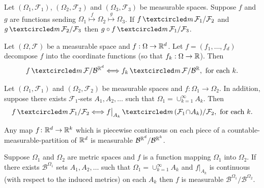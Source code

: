 \begin{theorem}
\label{thm: composition of measurable}
Let $(\Omega_1,\mathcal F_1)$, $(\Omega_2,\mathcal F_2)$ and $(\Omega_3,\mathcal F_3)$ be measurable spaces. Suppose $f$ and $g$ are functions sending $\Omega_1\overset{f} \longmapsto \Omega_2 \overset{g}\longmapsto \Omega_3$. If $f\mcirc \mathcal F_1/\mathcal F_2$ and $g\mcirc  \mathcal F_2/\mathcal F_3$ then $g\circ f \mcirc\mathcal F_1/\mathcal F_3$.
\end{theorem}


\begin{corollary}
\label{coordM}
Let $(\Omega,\mathcal F)$ be a measurable space and $f:\Omega\rightarrow \Bbb R^d$. Let $f=(f_1,\ldots, f_d)$ decompose $f$ into the coordinate functions (so that $f_k:\Omega\rightarrow \Bbb R$). Then
\[ f\mcirc \mathcal F/\mathcal B^{\Bbb R^d}\Longleftrightarrow  f_k\mcirc \mathcal F/\mathcal B^{\Bbb R}, \text{ for each $k$.} \]
\end{corollary}



\begin{theorem}
Let $(\Omega_1, \mathcal F_1)$ and $(\Omega_2,\mathcal F_2)$ be measurable spaces and $f\colon \Omega_1 \rightarrow \Omega_2$.  In addition, suppose there exists $\mathcal F_1$-sets $A_1,A_2,\ldots$ such that $\Omega_1 = \cup_{k=1}^\infty A_k$. Then
\[ f\mcirc \mathcal F_1/\mathcal F_2 \Longleftrightarrow  f\bigr|_{A_k} \mcirc (\mathcal F_1\!\cap\! A_k)/\mathcal F_2, \text{ for each $k$.} \]
\end{theorem}

\begin{corollary}
Any map $f\colon \Bbb R^d\rightarrow \Bbb R^k$ which is piecewise continuous on each piece of a  countable-measurable-partition of $\Bbb R^d$  is measurable $\mathcal B^{\Bbb R^d}/\mathcal B^{\Bbb R^k}$.
\end{corollary}


\begin{theorem}
Suppose $\Omega_1$ and $\Omega_2$ are metric spaces and $f$ is a function mapping $\Omega_1$ into $\Omega_2$.
If there exists $\mathcal B^{\Omega_1}$ sets $A_1,A_2,\ldots$ such that $\Omega_1=\cup_{k=1}^\infty A_k$ and $f\bigr|_{A_k}$ is continuous (with respect to the induced metrics) on each $A_k$ then $f$ is measurable $\mathcal B^{\Omega_1}/\mathcal B^{\Omega_2}$.
\end{theorem}


